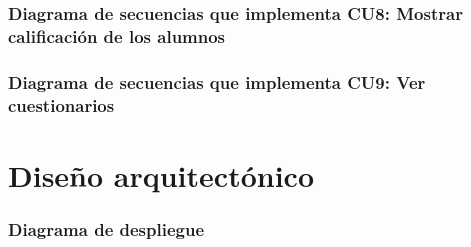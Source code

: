 \subsubsection{Diagrama de secuencias que implementa CU8: Mostrar calificación de los alumnos}

\subsubsection{Diagrama de secuencias que implementa CU9: Ver cuestionarios}

\section{Diseño arquitectónico}

\subsubsection{Diagrama de despliegue}



